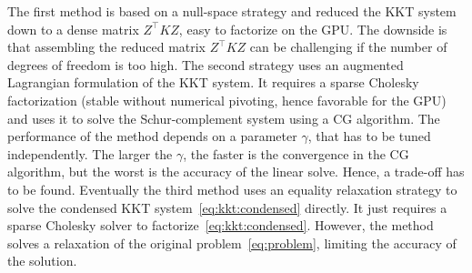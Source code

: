 The first method is based on a null-space
strategy and reduced the KKT system down to a dense matrix $Z^\top K Z$, easy
to factorize on the GPU. The downside is that assembling the reduced
matrix $Z^\top K Z$ can be challenging if the number of degrees of freedom
is too high. The second strategy uses an augmented Lagrangian formulation
of the KKT system. It requires a sparse Cholesky factorization (stable without numerical
pivoting, hence favorable for the GPU) and uses it to solve the Schur-complement system
using a CG algorithm. The performance of the method depends on a parameter $\gamma$, that
has to be tuned independently. The larger the $\gamma$, the faster is the convergence
in the CG algorithm, but the worst is the accuracy of the linear solve. Hence, a trade-off
has to be found. Eventually the third method uses an equality relaxation strategy to
solve the condensed KKT system~\eqref{eq:kkt:condensed} directly. It just requires
a sparse Cholesky solver to factorize~\eqref{eq:kkt:condensed}. However, the method
solves a relaxation of the original problem~\eqref{eq:problem}, limiting the accuracy
of the solution.

